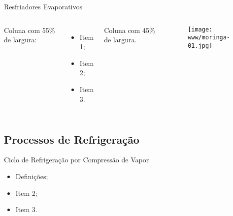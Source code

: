     \begin{frame}{Resfriadores Evaporativos}\vspace*{-0em}
        \begin{columns}
            Coluna com 55\% de largura:\\[\smallskipamount]
            \begin{itemize}
                \item<1-> Item 1;
                \item<2-> Item 2;
                \item<3-> Item 3.
            \end{itemize}
            Coluna com 45\% de largura.
            \begin{center}
                \begin{figure}
                    \texttt{[image: www/moringa-01.jpg]}
                \end{figure}
            \end{center}
        \end{columns}
    \end{frame}

\subsection{Processos de Refrigeração}

    \begin{frame}{Ciclo de Refrigeração por Compressão de Vapor}\vspace*{-0em}
        \begin{itemize}
            \item<1-> Definições;
            \item<1-> Item 2;
            \item<1-> Item 3.
        \end{itemize}
    \end{frame}

